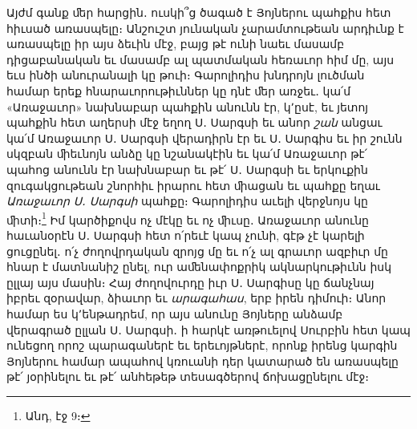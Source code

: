 \documentclass{article}
\begin{document}
{Այժմ գանք ﬔր հարցին․ ուսկի՞ց ծագած է Յոյներու պահքիս հետ հիւսած առասպելը։ Անշուշտ յունական չարամտութեան արդիւնք է առասպելը իր այս ձեւին մէջ, բայց թէ ունի նաեւ մասամբ դիցաբանական եւ մասամբ ալ պատմական հեռաւոր հիմ մը, այս եւս ինծի անուրանալի կը թուի։ Գարոլիդիս խնդրոյն լուծման համար երեք հնարաւորութիւններ կը դնէ ﬔր առջեւ․ կա՛մ «Առաջաւոր» նախնաբար պահքին անունն էր, կ՚ըսէ, եւ յետոյ պահքին հետ աղերսի մէջ եղող Ս․ Սարգսի եւ անոր \emph{շան} անցաւ կա՛մ Առաջաւոր Ս․ Սարգսի վերադիրն էր եւ Ս․ Սարգիս եւ իր շունն սկզբան ﬕեւնոյն անձը կը նշանակէին եւ կա՛մ Առաջաւոր թէ՛ պահոց անունն էր նախնաբար եւ թէ՛ Ս․ Սարգսի եւ երկուքին զուգակցութեան շնորհիւ իրարու հետ ﬕացան եւ պահքը եղաւ \emph{Առաջաւոր Ս․ Սարգսի} պահքը։ Գարոլիդիս աւելի վերջնոյս կը ﬕտի։\footnote{Անդ, էջ 9։} Իմ կարծիքովս ոչ մէկը եւ ոչ ﬕւսը․ Առաջաւոր անունը հաւանօրէն Ս․ Սարգսի հետ ո՛րեւէ կապ չունի, գէթ չէ կարելի ցուցընել․ ո՛չ ժողովրդական զրոյց մը եւ ո՛չ ալ գրաւոր ազբիւր մը հնար է մատնանիշ ընել, ուր աﬔնափոքրիկ ակնարկութիւնն իսկ ըլլայ այս մասին։ Հայ ժողովուրդը իւր Ս․ Սարգիսը կը ճանչնայ իբրեւ զօրավար, ձիաւոր եւ \emph{արագահաս}, երբ իրեն դիմուի։ Անոր համար ես կ՚ենթադրեմ, որ այս անունը Յոյները անձամբ վերագրած ըլլան Ս․ Սարգսի․ ի հարկէ առթուելով Սուրբին հետ կապ ունեցող որոշ պարագաներէ եւ երեւոյթներէ, որոնք իրենց կարգին Յոյներու համար ապահով կռուանի դեր կատարած են առասպելը թէ՛ յօրինելու եւ թէ՛ անհեթեթ տեսագծերով ճոխացընելու մէջ։

}
\end{document}
